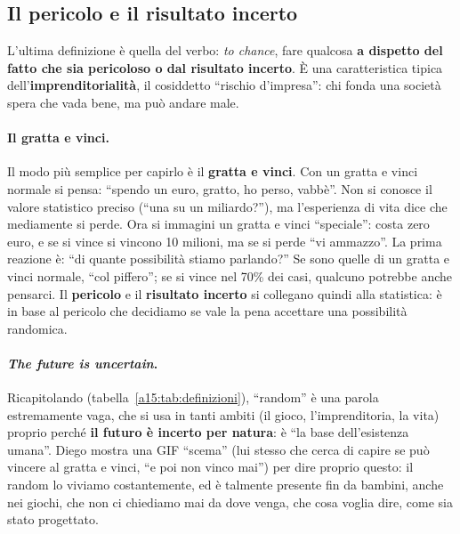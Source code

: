 \subsection{Il pericolo e il risultato incerto}

L'ultima definizione è quella del verbo: \emph{to chance}, fare qualcosa \textbf{a dispetto
del fatto che sia pericoloso o dal risultato incerto}. È una caratteristica tipica
dell'\textbf{imprenditorialità}, il cosiddetto ``rischio d'impresa'': chi fonda una società
spera che vada bene, ma può andare male.

\paragraph{Il gratta e vinci.} Il modo più semplice per capirlo è il \textbf{gratta e vinci}.
Con un gratta e vinci normale si pensa: ``spendo un euro, gratto, ho perso, vabbè''. Non si
conosce il valore statistico preciso (``una su un miliardo?''), ma l'esperienza di vita dice
che mediamente si perde. Ora si immagini un gratta e vinci ``speciale'': costa zero euro, e
se si vince si vincono 10 milioni, ma se si perde ``vi ammazzo''. La prima reazione è:
``di quante possibilità stiamo parlando?'' Se sono quelle di un gratta e vinci normale, ``col
piffero''; se si vince nel 70\% dei casi, qualcuno potrebbe anche pensarci. Il
\textbf{pericolo} e il \textbf{risultato incerto} si collegano quindi alla statistica: è in
base al pericolo che decidiamo se vale la pena accettare una possibilità randomica.

\paragraph{\emph{The future is uncertain}.} Ricapitolando (tabella~\ref{a15:tab:definizioni}),
``random'' è una parola estremamente vaga, che si usa in tanti ambiti (il gioco,
l'imprenditoria, la vita) proprio perché \textbf{il futuro è incerto per natura}: è ``la base
dell'esistenza umana''. Diego mostra una GIF ``scema'' (lui stesso che cerca di capire se può
vincere al gratta e vinci, ``e poi non vinco mai'') per dire proprio questo: il random lo
viviamo costantemente, ed è talmente presente fin da bambini, anche nei giochi, che non ci
chiediamo mai da dove venga, che cosa voglia dire, come sia stato progettato.

